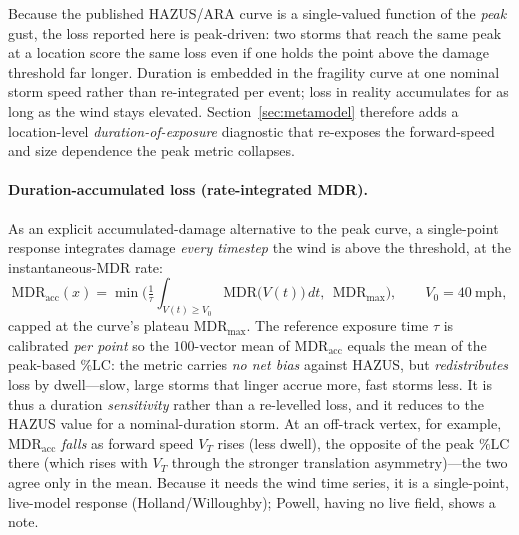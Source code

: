 \documentclass[11pt]{article}
\begin{document}
Because the published HAZUS/ARA curve is a single-valued function of the
\emph{peak} gust, the loss reported here is peak-driven: two storms that reach the
same peak at a location score the same loss even if one holds the point above the
damage threshold far longer. Duration is embedded in the fragility curve at one
nominal storm speed rather than re-integrated per event; loss in reality
accumulates for as long as the wind stays elevated. Section~\ref{sec:metamodel}
therefore adds a location-level \emph{duration-of-exposure} diagnostic that
re-exposes the forward-speed and size dependence the peak metric collapses.

\paragraph{Duration-accumulated loss (rate-integrated MDR).}
As an explicit accumulated-damage alternative to the peak curve, a single-point
response integrates damage \emph{every timestep} the wind is above the threshold,
at the instantaneous-MDR rate:
\[
\mathrm{MDR}_{\mathrm{acc}}(x)=\min\!\Big(\tfrac1\tau\!\!\int_{V(t)\ge V_0}\!\!\!\!
\mathrm{MDR}\big(V(t)\big)\,dt,\ \ \mathrm{MDR}_{\max}\Big),\qquad V_0=40\ \text{mph},
\]
capped at the curve's plateau $\mathrm{MDR}_{\max}$. The reference exposure time
$\tau$ is calibrated \emph{per point} so the $100$-vector mean of
$\mathrm{MDR}_{\mathrm{acc}}$ equals the mean of the peak-based $\%\mathrm{LC}$: the
metric carries \emph{no net bias} against HAZUS, but \emph{redistributes} loss by
dwell---slow, large storms that linger accrue more, fast storms less. It is thus a
duration \emph{sensitivity} rather than a re-levelled loss, and it reduces to the
HAZUS value for a nominal-duration storm. At an off-track vertex, for example,
$\mathrm{MDR}_{\mathrm{acc}}$ \emph{falls} as forward speed $V_T$ rises (less dwell),
the opposite of the peak $\%\mathrm{LC}$ there (which rises with $V_T$ through the
stronger translation asymmetry)---the two agree only in the mean. Because it needs
the wind time series, it is a single-point, live-model response
(Holland/Willoughby); Powell, having no live field, shows a note.
\end{document}
